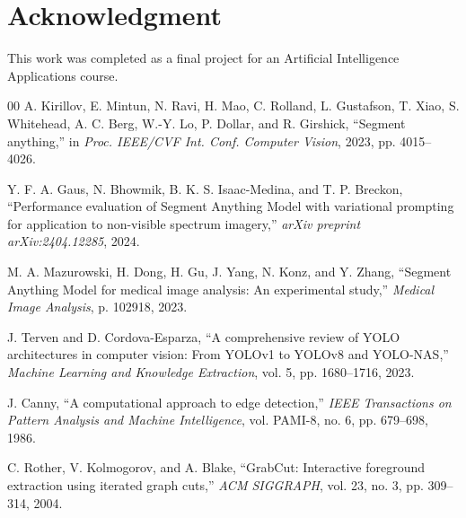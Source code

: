 \documentclass[conference]{IEEEtran}
\begin{document}
\section*{Acknowledgment}
This work was completed as a final project for an Artificial Intelligence Applications course.

\begin{thebibliography}{00}
A. Kirillov, E. Mintun, N. Ravi, H. Mao, C. Rolland, L. Gustafson, T. Xiao, S. Whitehead, A. C. Berg, W.-Y. Lo, P. Dollar, and R. Girshick, ``Segment anything,'' in \textit{Proc. IEEE/CVF Int. Conf. Computer Vision}, 2023, pp. 4015--4026.

Y. F. A. Gaus, N. Bhowmik, B. K. S. Isaac-Medina, and T. P. Breckon, ``Performance evaluation of Segment Anything Model with variational prompting for application to non-visible spectrum imagery,'' \textit{arXiv preprint arXiv:2404.12285}, 2024.

M. A. Mazurowski, H. Dong, H. Gu, J. Yang, N. Konz, and Y. Zhang, ``Segment Anything Model for medical image analysis: An experimental study,'' \textit{Medical Image Analysis}, p. 102918, 2023.

J. Terven and D. Cordova-Esparza, ``A comprehensive review of YOLO architectures in computer vision: From YOLOv1 to YOLOv8 and YOLO-NAS,'' \textit{Machine Learning and Knowledge Extraction}, vol. 5, pp. 1680--1716, 2023.

J. Canny, ``A computational approach to edge detection,'' \textit{IEEE Transactions on Pattern Analysis and Machine Intelligence}, vol. PAMI-8, no. 6, pp. 679--698, 1986.

C. Rother, V. Kolmogorov, and A. Blake, ``GrabCut: Interactive foreground extraction using iterated graph cuts,'' \textit{ACM SIGGRAPH}, vol. 23, no. 3, pp. 309--314, 2004.
\end{thebibliography}
\end{document}
